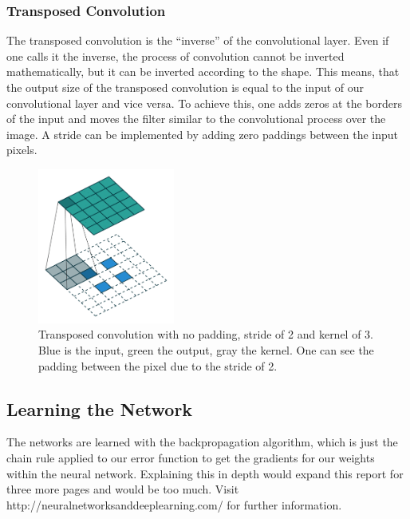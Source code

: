 \documentclass[
     11pt,         %
     a4paper,      %
     oneside,
     ]{article}
\begin{document}
\subsubsection{Transposed Convolution}
The transposed convolution is the \enquote{inverse} of the convolutional layer. Even if one calls it the inverse, the process of convolution cannot be inverted mathematically, but it can be inverted according to the shape.
This means, that the output size of the transposed convolution is equal to the input of our convolutional layer and vice versa. To achieve this, one adds zeros at the borders of the input and moves the filter similar to the convolutional process over the image. A stride can be implemented by adding zero paddings between the input pixels.
\begin{figure}[H]
  \begin{center}
    \includegraphics[width=0.4\textwidth]{images/tConv.png}
    \caption{Transposed convolution with no padding, stride of 2 and kernel of 3. Blue is the input, green the output, gray the kernel. One can see the padding between the pixel due to the stride of 2.}
    \label{fig:tConv}
  \end{center}
\end{figure}

\subsection{Learning the Network}
The networks are learned with the backpropagation algorithm, which is just the chain rule applied to our error function to get the gradients for our weights within the neural network. Explaining this in depth would expand this report for three more pages and would be too much. Visit http://neuralnetworksanddeeplearning.com/ for further information.
\end{document}
